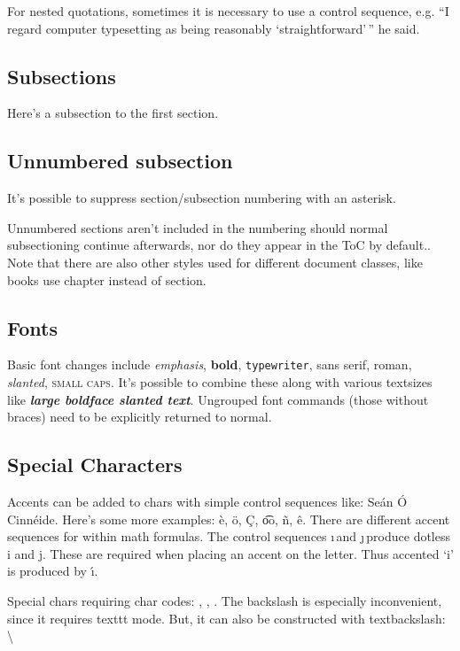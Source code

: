 \documentclass[a4paper,12pt]{article}
\begin{document}
For nested quotations, sometimes it is necessary to use a control sequence,
e.g. ``I regard computer typesetting as being reasonably `straightforward'\,''
he said.

\subsection{Subsections}

Here's a subsection to the first section.

\subsection*{Unnumbered subsection}

It's possible to suppress section/subsection numbering with an asterisk.

Unnumbered sections aren't included in the numbering should normal
subsectioning continue afterwards, nor do they appear in the ToC by default..
Note that there are also other styles used for different document classes, like
books use chapter instead of section.

\subsection{Fonts}

Basic font changes include \emph{emphasis}, \textbf{bold}, \texttt{typewriter},
\textsf{sans serif}, \textrm{roman}, \textsl{slanted}, \textsc{small caps}.
It's possible to combine these along with various textsizes like \large
\textbf{\textsl{large boldface slanted text}}.  \normalsize Ungrouped font
commands (those without braces) need to be explicitly returned to normal.

\subsection{Special Characters}

Accents can be added to chars with simple control sequences like: Se\'{a}n
\'{O} Cinn\'{e}ide.  Here's some more examples: \`{e}, \"{o}, \c{C}, \t{oo},
\~{n}, \^{e}.  There are different accent sequences for within math formulas.
The control sequences \i \,and \j \,produce dotless i and j. These are required
when placing an accent on the letter. Thus accented `i' is produced by \'{\i}.

Special chars requiring char codes: \texttt{}, , .  The
backslash is especially inconvenient, since it requires texttt mode.
But, it can also be constructed with textbackslash: \textbackslash 
\end{document}
